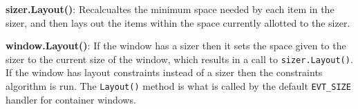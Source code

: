 {\bf sizer.Layout()}: Recalcualtes the minimum space needed by each
item in the sizer, and then lays out the items within the space
currently allotted to the sizer.

{\bf window.Layout()}: If the window has a sizer then it sets the
space given to the sizer to the current size of the window, which
results in a call to \texttt{sizer.Layout()}. If the window has layout
constraints instead of a sizer then the constraints algorithm is
run. The \texttt{Layout()} method is what is called by the default
\texttt{EVT\_SIZE} handler for container windows.





